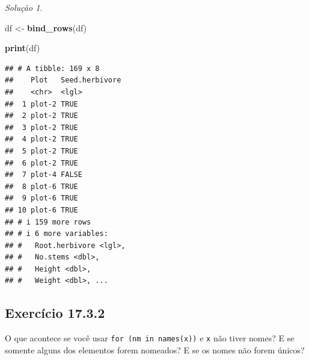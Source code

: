 \documentclass[
]{latex/krantz}
\newenvironment{Shaded}{\begin{snugshade}}{\end{snugshade}}
\newcommand{\FunctionTok}[1]{\textcolor[rgb]{0.13,0.29,0.53}{\textbf{#1}}}
\newcommand{\NormalTok}[1]{#1}
\newcommand{\OtherTok}[1]{\textcolor[rgb]{0.56,0.35,0.01}{#1}}
\theoremstyle{definition}
\theoremstyle{definition}
\theoremstyle{definition}
\theoremstyle{definition}
\theoremstyle{remark}
\newtheorem*{solution}{Solução}
\begin{document}
\begin{solution}
\begin{Shaded}
\begin{Highlighting}[]
\NormalTok{df }\OtherTok{\textless{}{-}} \FunctionTok{bind\_rows}\NormalTok{(df)}

\FunctionTok{print}\NormalTok{(df)}
\end{Highlighting}
\end{Shaded}

\begin{verbatim}
## # A tibble: 169 x 8
##    Plot   Seed.herbivore
##    <chr>  <lgl>         
##  1 plot-2 TRUE          
##  2 plot-2 TRUE          
##  3 plot-2 TRUE          
##  4 plot-2 TRUE          
##  5 plot-2 TRUE          
##  6 plot-2 TRUE          
##  7 plot-4 FALSE         
##  8 plot-6 TRUE          
##  9 plot-6 TRUE          
## 10 plot-6 TRUE          
## # i 159 more rows
## # i 6 more variables:
## #   Root.herbivore <lgl>,
## #   No.stems <dbl>,
## #   Height <dbl>,
## #   Weight <dbl>, ...
\end{verbatim}

\end{solution}

\hypertarget{exr17-3-2}{%
\subsection*{Exercício 17.3.2}\label{exr17-3-2}}

O que acontece se você usar \texttt{for\ (nm\ in\ names(x))} e \texttt{x} não tiver nomes? E se somente alguns dos elementos forem nomeados? E se os nomes não forem únicos?
\end{document}
